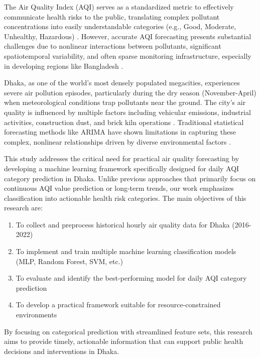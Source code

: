 \documentclass[a4paper,fleqn]{cas-dc}
\begin{document}
The Air Quality Index (AQI) serves as a standardized metric to effectively communicate health risks to the public, translating complex pollutant concentrations into easily understandable categories (e.g., Good, Moderate, Unhealthy, Hazardous) \cite{epa_aqi_2020}. However, accurate AQI forecasting presents substantial challenges due to nonlinear interactions between pollutants, significant spatiotemporal variability, and often sparse monitoring infrastructure, especially in developing regions like Bangladesh \cite{world_bank_2021}.

Dhaka, as one of the world's most densely populated megacities, experiences severe air pollution episodes, particularly during the dry season (November-April) when meteorological conditions trap pollutants near the ground. The city's air quality is influenced by multiple factors including vehicular emissions, industrial activities, construction dust, and brick kiln operations \cite{dob_2022}. Traditional statistical forecasting methods like ARIMA have shown limitations in capturing these complex, nonlinear relationships driven by diverse environmental factors \cite{zhang_2017}.

This study addresses the critical need for practical air quality forecasting by developing a machine learning framework specifically designed for daily AQI category prediction in Dhaka. Unlike previous approaches that primarily focus on continuous AQI value prediction or long-term trends, our work emphasizes classification into actionable health risk categories. The main objectives of this research are:

\begin{enumerate}
    \item To collect and preprocess historical hourly air quality data for Dhaka (2016-2022)
    \item To implement and train multiple machine learning classification models (MLP, Random Forest, SVM, etc.)
    \item To evaluate and identify the best-performing model for daily AQI category prediction
    \item To develop a practical framework suitable for resource-constrained environments
\end{enumerate}

By focusing on categorical prediction with streamlined feature sets, this research aims to provide timely, actionable information that can support public health decisions and interventions in Dhaka.
\end{document}
